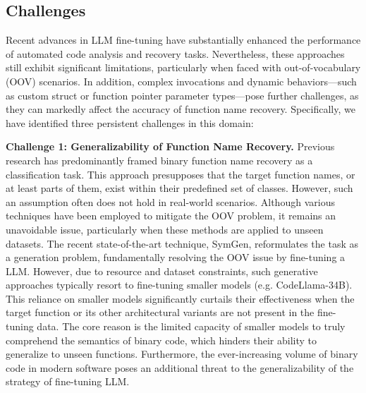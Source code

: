 \documentclass[acmsmall,screen,review,anonymous]{acmart} %
\begin{document}



\subsection{Challenges}
Recent advances in LLM fine-tuning have substantially enhanced the performance of automated code analysis and recovery tasks. Nevertheless, these approaches still exhibit significant limitations, particularly when faced with out-of-vocabulary (OOV) scenarios. In addition, complex invocations and dynamic behaviors—such as custom struct or function pointer parameter types—pose further challenges, as they can markedly affect the accuracy of function name recovery.
Specifically, we have identified three persistent challenges in this domain:

\textbf{Challenge 1: Generalizability of Function Name Recovery.}
Previous research\cite{Debin, NERO, NFRE, Dire, SymLM, XFL, AsmDepictor} has predominantly framed binary function name recovery as a classification task. This approach presupposes that the target function names, or at least parts of them, exist within their predefined set of classes. However, such an assumption often does not hold in real-world scenarios. Although various techniques\cite{SymLM, XFL} have been employed to mitigate the OOV problem, it remains an unavoidable issue, particularly when these methods are applied to unseen datasets. The recent state-of-the-art technique, SymGen\cite{SymGen}, reformulates the task as a generation problem, fundamentally resolving the OOV issue by fine-tuning a LLM. However, due to resource and dataset constraints, such generative approaches typically resort to fine-tuning smaller models (e.g. CodeLlama-34B\cite{CodeLlama}). This reliance on smaller models significantly curtails their effectiveness when the target function or its other architectural variants are not present in the fine-tuning data. The core reason is the limited capacity of smaller models to truly comprehend the semantics of binary code, which hinders their ability to generalize to unseen functions. Furthermore, the ever-increasing volume of binary code in modern software poses an additional threat to the generalizability of the strategy of fine-tuning LLM.
\end{document}
